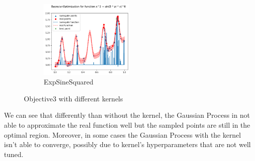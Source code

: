 \begin{figure}[H]
    \begin{subfigure}{\textwidth}
        \centering
        \includegraphics[width=0.5\textwidth]{lab6/imgs/obj3_exp.png}
        \caption{ExpSineSquared}
    \end{subfigure}
    \caption{Objective3 with different kernels}
    \label{fig:bo-kernel}
\end{figure}
We can see that differently than without the kernel, the Gaussian Process in not able to approximate the real function well but the sampled points are still in the optimal region. Moreover, in some cases the Gaussian Process with the kernel isn't able to converge, possibly due to kernel's hyperparameters that are not well tuned.
